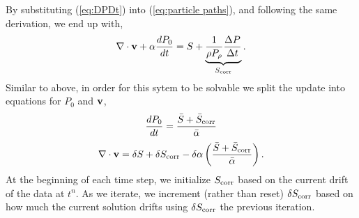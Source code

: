 \documentclass[final]{siamltex}
\def\vb {{\bf v}}
\begin{document}
By substituting (\ref{eq:DPDt}) into (\ref{eq:particle paths}),
and following the same derivation, we end up with,
\begin{equation}
\nabla\cdot\vb + \alpha\frac{dP_0}{dt} = S + \underbrace{\frac{1}{\rho P_\rho}\frac{\Delta P}{\Delta t}}_{S_{\rm corr}}.
\end{equation}
Similar to above, in order for this sytem to be solvable we split the update into
equations for $P_0$ and $\vb$,
\begin{equation}
\frac{dP_0}{dt} = \frac{\bar{S} + \bar{S}_{\rm corr}}{\bar{\alpha}}
\end{equation}
\begin{equation}
\nabla\cdot\vb = \delta S + \delta S_{\rm corr} - \delta\alpha\left(\frac{\bar{S} + \bar{S}_{\rm corr}}{\bar{\alpha}}\right).
\end{equation}
At the beginning of each time step, we initialize $S_{\rm corr}$ based on the current drift of the data at $t^n$.
As we iterate, we increment (rather than reset) $\delta S_{\rm corr}$ based on how much 
the current solution drifts using $\delta S_{\rm corr}$ the previous iteration.
\end{document}
